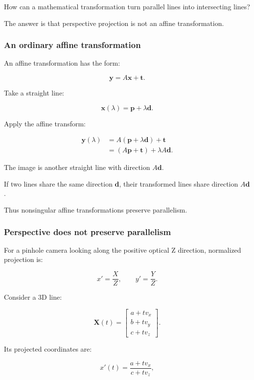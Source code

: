 How can a mathematical transformation turn parallel lines into intersecting lines?

The answer is that perspective projection is not an affine transformation.

\subsubsection{An ordinary affine transformation}\label{02-foundations-ii-ch032-an-ordinary-affine-transformation}

An affine transformation has the form:

\[
 \boxed{ \mathbf y=A\mathbf x+\mathbf t }.
\]

Take a straight line:

\[
 \mathbf x(\lambda)=\mathbf p+\lambda\mathbf d.
\]

Apply the affine transform:

\[
 \begin{aligned} \mathbf y(\lambda) &= A(\mathbf p+\lambda\mathbf d)+\mathbf t\\ &= (A\mathbf p+\mathbf t)+\lambda A\mathbf d. \end{aligned}
\]

The image is another straight line with direction \(A\mathbf d\).

If two lines share the same direction \(\mathbf d\), their transformed lines share direction \(A\mathbf d\).

Thus nonsingular affine transformations preserve parallelism.

\subsubsection{Perspective does not preserve parallelism}\label{02-foundations-ii-ch032-perspective-does-not-preserve-parallelism}

For a pinhole camera looking along the positive optical Z direction, normalized projection is:

\[
 \boxed{ x'=\frac XZ,\qquad y'=\frac YZ }.
\]

Consider a 3D line:

\[
 \mathbf X(t)= \begin{bmatrix} a+tv_x\\ b+tv_y\\ c+tv_z \end{bmatrix}.
\]

Its projected coordinates are:

\[
 x'(t)=\frac{a+tv_x}{c+tv_z},
\]

